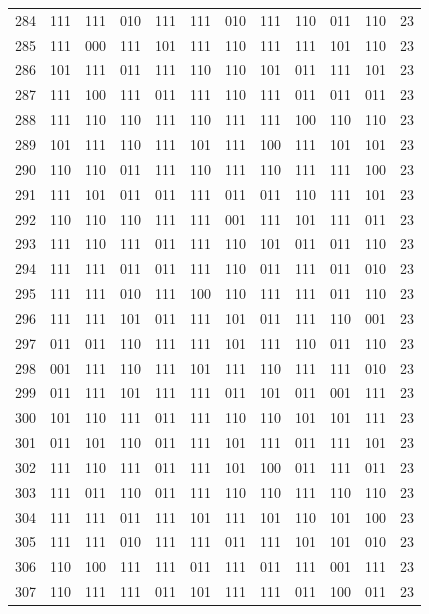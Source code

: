 \begin{longtable}{r*{10}{c}r}
284 & 111 & 111 & 010 & 111 & 111 & 010 & 111 & 110 & 011 & 110 & 23\\
285 & 111 & 000 & 111 & 101 & 111 & 110 & 111 & 111 & 101 & 110 & 23\\
286 & 101 & 111 & 011 & 111 & 110 & 110 & 101 & 011 & 111 & 101 & 23\\
287 & 111 & 100 & 111 & 011 & 111 & 110 & 111 & 011 & 011 & 011 & 23\\
288 & 111 & 110 & 110 & 111 & 110 & 111 & 111 & 100 & 110 & 110 & 23\\
289 & 101 & 111 & 110 & 111 & 101 & 111 & 100 & 111 & 101 & 101 & 23\\
290 & 110 & 110 & 011 & 111 & 110 & 111 & 110 & 111 & 111 & 100 & 23\\
291 & 111 & 101 & 011 & 011 & 111 & 011 & 011 & 110 & 111 & 101 & 23\\
292 & 110 & 110 & 110 & 111 & 111 & 001 & 111 & 101 & 111 & 011 & 23\\
293 & 111 & 110 & 111 & 011 & 111 & 110 & 101 & 011 & 011 & 110 & 23\\
294 & 111 & 111 & 011 & 011 & 111 & 110 & 011 & 111 & 011 & 010 & 23\\
295 & 111 & 111 & 010 & 111 & 100 & 110 & 111 & 111 & 011 & 110 & 23\\
296 & 111 & 111 & 101 & 011 & 111 & 101 & 011 & 111 & 110 & 001 & 23\\
297 & 011 & 011 & 110 & 111 & 111 & 101 & 111 & 110 & 011 & 110 & 23\\
298 & 001 & 111 & 110 & 111 & 101 & 111 & 110 & 111 & 111 & 010 & 23\\
299 & 011 & 111 & 101 & 111 & 111 & 011 & 101 & 011 & 001 & 111 & 23\\
300 & 101 & 110 & 111 & 011 & 111 & 110 & 110 & 101 & 101 & 111 & 23\\
301 & 011 & 101 & 110 & 011 & 111 & 101 & 111 & 011 & 111 & 101 & 23\\
302 & 111 & 110 & 111 & 011 & 111 & 101 & 100 & 011 & 111 & 011 & 23\\
303 & 111 & 011 & 110 & 011 & 111 & 110 & 110 & 111 & 110 & 110 & 23\\
304 & 111 & 111 & 011 & 111 & 101 & 111 & 101 & 110 & 101 & 100 & 23\\
305 & 111 & 111 & 010 & 111 & 111 & 011 & 111 & 101 & 101 & 010 & 23\\
306 & 110 & 100 & 111 & 111 & 011 & 111 & 011 & 111 & 001 & 111 & 23\\
307 & 110 & 111 & 111 & 011 & 101 & 111 & 111 & 011 & 100 & 011 & 23\\

\end{longtable}
